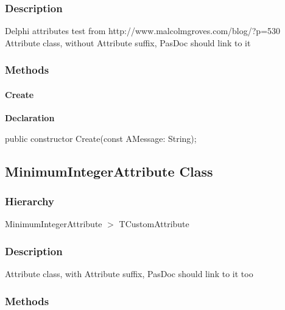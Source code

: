 \documentclass{report}
\begin{document}
\subsubsection*{\large{\textbf{Description}}\normalsize\hspace{1ex}\hfill}
Delphi attributes test from http://www.malcolmgroves.com/blog/?p=530 Attribute class, without Attribute suffix, PasDoc should link to it\subsubsection*{\large{\textbf{Methods}}\normalsize\hspace{1ex}\hfill}
\paragraph*{Create}\hspace*{\fill}

\begin{list}{}{
\setlength{\itemindent}{0cm}
\setlength{\listparindent}{0cm}
\setlength{\leftmargin}{\evensidemargin}
\addtolength{\leftmargin}{\tmplength}
\settowidth{\labelsep}{X}
\addtolength{\leftmargin}{\labelsep}
\setlength{\labelwidth}{\tmplength}
}
\begin{flushleft}
\item[\textbf{Declaration}\hfill]
\begin{ttfamily}
public constructor Create(const AMessage: String);\end{ttfamily}


\end{flushleft}
\end{list}
\subsection*{MinimumIntegerAttribute Class}
\subsubsection*{\large{\textbf{Hierarchy}}\normalsize\hspace{1ex}\hfill}
MinimumIntegerAttribute {$>$} TCustomAttribute
\subsubsection*{\large{\textbf{Description}}\normalsize\hspace{1ex}\hfill}
Attribute class, with Attribute suffix, PasDoc should link to it too\subsubsection*{\large{\textbf{Methods}}\normalsize\hspace{1ex}\hfill}
\end{document}
